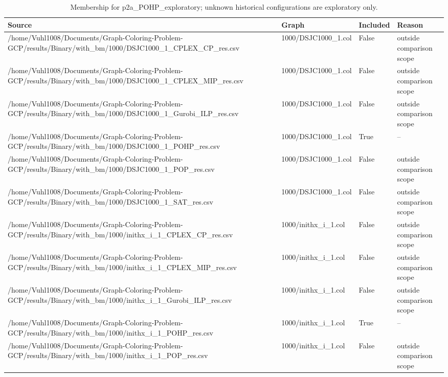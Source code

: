\begin{table}[htbp]
\centering
\caption{Membership for p2a\_POHP\_exploratory; unknown historical configurations are exploratory only.}
\label{tab:p2a-POHP-exploratory-membership}
\begin{tabular}{llll}
\hline
Source & Graph & Included & Reason \\
\hline
/home/Vuhl1008/Documents/Graph-Coloring-Problem-GCP/results/Binary/with\_bm/1000/DSJC1000\_1\_CPLEX\_CP\_res.csv & 1000/DSJC1000\_1.col & False & outside comparison scope \\
/home/Vuhl1008/Documents/Graph-Coloring-Problem-GCP/results/Binary/with\_bm/1000/DSJC1000\_1\_CPLEX\_MIP\_res.csv & 1000/DSJC1000\_1.col & False & outside comparison scope \\
/home/Vuhl1008/Documents/Graph-Coloring-Problem-GCP/results/Binary/with\_bm/1000/DSJC1000\_1\_Gurobi\_ILP\_res.csv & 1000/DSJC1000\_1.col & False & outside comparison scope \\
/home/Vuhl1008/Documents/Graph-Coloring-Problem-GCP/results/Binary/with\_bm/1000/DSJC1000\_1\_POHP\_res.csv & 1000/DSJC1000\_1.col & True & -- \\
/home/Vuhl1008/Documents/Graph-Coloring-Problem-GCP/results/Binary/with\_bm/1000/DSJC1000\_1\_POP\_res.csv & 1000/DSJC1000\_1.col & False & outside comparison scope \\
/home/Vuhl1008/Documents/Graph-Coloring-Problem-GCP/results/Binary/with\_bm/1000/DSJC1000\_1\_SAT\_res.csv & 1000/DSJC1000\_1.col & False & outside comparison scope \\
/home/Vuhl1008/Documents/Graph-Coloring-Problem-GCP/results/Binary/with\_bm/1000/inithx\_i\_1\_CPLEX\_CP\_res.csv & 1000/inithx\_i\_1.col & False & outside comparison scope \\
/home/Vuhl1008/Documents/Graph-Coloring-Problem-GCP/results/Binary/with\_bm/1000/inithx\_i\_1\_CPLEX\_MIP\_res.csv & 1000/inithx\_i\_1.col & False & outside comparison scope \\
/home/Vuhl1008/Documents/Graph-Coloring-Problem-GCP/results/Binary/with\_bm/1000/inithx\_i\_1\_Gurobi\_ILP\_res.csv & 1000/inithx\_i\_1.col & False & outside comparison scope \\
/home/Vuhl1008/Documents/Graph-Coloring-Problem-GCP/results/Binary/with\_bm/1000/inithx\_i\_1\_POHP\_res.csv & 1000/inithx\_i\_1.col & True & -- \\
/home/Vuhl1008/Documents/Graph-Coloring-Problem-GCP/results/Binary/with\_bm/1000/inithx\_i\_1\_POP\_res.csv & 1000/inithx\_i\_1.col & False & outside comparison scope \\

\end{tabular}
\end{table}
